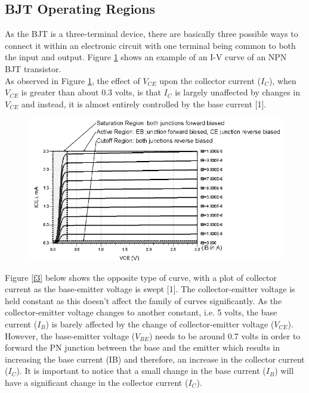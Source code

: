 \documentclass{article}
\begin{document}
	\subsection{BJT Operating Regions}
	As the BJT is a three-terminal device, there are basically three possible ways to connect it within an electronic circuit with one terminal being common to both the input and output.
	Figure \ref{f2} shows an example of an I-V curve of an NPN BJT transistor.\\
	As observed in Figure \ref{f2}, the effect of $V_{CE}$ upon the collector current ($I_C$), when $V_{CE}$ is greater than about 0.3 volts, is that $I_C$ is largely unaffected by changes in $V_{CE}$ and instead, it is almost entirely controlled by the base current [1].
	
	\begin{figure}[!ht]
		\centering
		\includegraphics[width=0.7\linewidth]{I-V_characterization_curve.png}
		\label{f2}
	\end{figure}

	\noindent Figure \ref{f3} below shows the opposite type of curve, with a plot of collector current as the base-emitter voltage is swept [1].
	The collector-emitter voltage is held constant as this doesn’t affect the family of curves significantly.
	As the collector-emitter voltage changes to another constant, i.e. 5 volts, the base current ($I_B$) is barely affected by the change of collector-emitter voltage ($V_{CE}$).
	However, the base-emitter voltage ($V_{BE}$) needs to be around 0.7 volts in order to forward the PN junction between the base and the emitter which results in increasing the base current (IB) and therefore, an increase in the collector current ($I_C$).
	It is important to notice that a small change in the base current ($I_B$) will have a significant change in the collector current ($I_C$).
	
\end{document}

